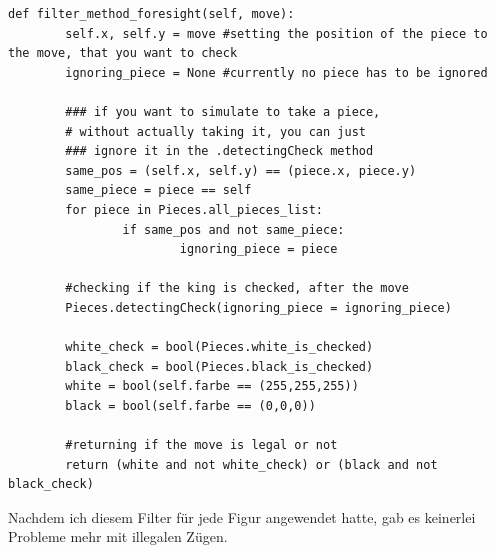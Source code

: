 \documentclass[a4paper, 10pt]{scrartcl}
\begin{document}
\begin{lstlisting}
def filter_method_foresight(self, move):
        self.x, self.y = move #setting the position of the piece to the move, that you want to check
        ignoring_piece = None #currently no piece has to be ignored

        ### if you want to simulate to take a piece, 
        # without actually taking it, you can just 
        ### ignore it in the .detectingCheck method
        same_pos = (self.x, self.y) == (piece.x, piece.y)
        same_piece = piece == self
        for piece in Pieces.all_pieces_list:
                if same_pos and not same_piece:
                        ignoring_piece = piece

        #checking if the king is checked, after the move
        Pieces.detectingCheck(ignoring_piece = ignoring_piece)

        white_check = bool(Pieces.white_is_checked)
        black_check = bool(Pieces.black_is_checked)
        white = bool(self.farbe == (255,255,255))
        black = bool(self.farbe == (0,0,0))

        #returning if the move is legal or not
        return (white and not white_check) or (black and not black_check)
\end{lstlisting}
Nachdem ich diesem Filter für jede Figur angewendet hatte, gab es keinerlei Probleme mehr mit
illegalen Zügen. 

\pagebreak
\end{document}
